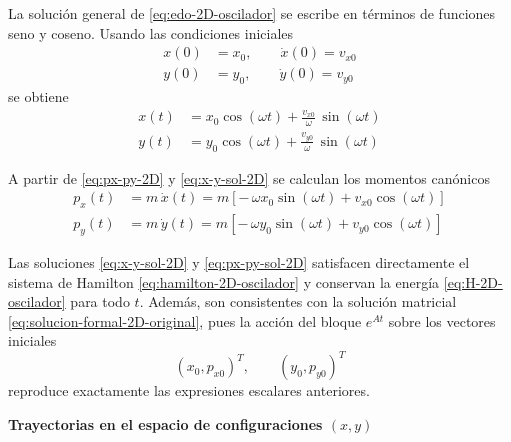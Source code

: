 \documentclass{article}
\begin{document}
La solución general de \eqref{eq:edo-2D-oscilador} se escribe en términos de
funciones seno y coseno. Usando las condiciones iniciales
\begin{equation}
\begin{split}
x(0) &= x_{0},
\qquad
\dot{x}(0) = v_{x0} \\[4pt]
y(0) &= y_{0},
\qquad
\dot{y}(0) = v_{y0}
\end{split}
\label{eq:condiciones-iniciales-2D}
\end{equation}
se obtiene
\begin{equation}
\begin{split}
x(t) &= x_{0}\cos(\omega t)
     + \frac{v_{x0}}{\omega}\,\sin(\omega t) \\[4pt]
y(t) &= y_{0}\cos(\omega t)
     + \frac{v_{y0}}{\omega}\,\sin(\omega t)
\end{split}
\label{eq:x-y-sol-2D}
\end{equation}

A partir de \eqref{eq:px-py-2D} y \eqref{eq:x-y-sol-2D} se calculan los momentos
canónicos
\begin{equation}
\begin{split}
p_{x}(t)
&= m\,\dot{x}(t)
 = m\left[
     -\,\omega x_{0}\sin(\omega t)
     + v_{x0}\cos(\omega t)
   \right] \\[6pt]
p_{y}(t)
&= m\,\dot{y}(t)
 = m\left[
     -\,\omega y_{0}\sin(\omega t)
     + v_{y0}\cos(\omega t)
   \right]
\end{split}
\label{eq:px-py-sol-2D}
\end{equation}

Las soluciones \eqref{eq:x-y-sol-2D} y \eqref{eq:px-py-sol-2D} satisfacen
directamente el sistema de Hamilton \eqref{eq:hamilton-2D-oscilador} y
conservan la energía \eqref{eq:H-2D-oscilador} para todo $t$. Además, son
consistentes con la solución matricial \eqref{eq:solucion-formal-2D-original},
pues la acción del bloque $e^{At}$ sobre los vectores iniciales
\[
(x_{0},p_{x0})^{T},
\qquad
(y_{0},p_{y0})^{T}
\]
reproduce exactamente las expresiones escalares anteriores.

\textcolor{trueblue}{\textbf{Trayectorias en el espacio de configuraciones $(x,y)$}}
\end{document}
